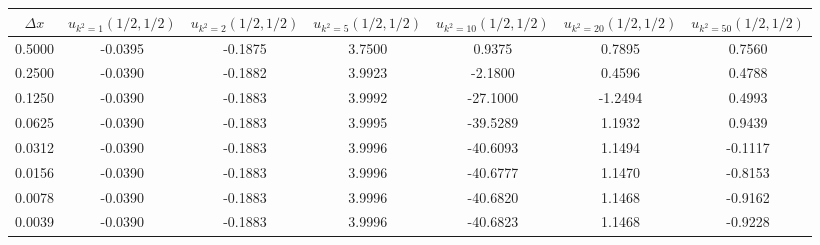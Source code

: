 \begin{tabular}{|c|c|c|c|c|c|c|}
\hline
\textbf{$\Delta x$}&\textbf{$u_{k^2=1}(1/2, 1/2)$}&\textbf{$u_{k^2=2}(1/2, 1/2)$}&\textbf{$u_{k^2=5}(1/2, 1/2)$}&\textbf{$u_{k^2=10}(1/2, 1/2)$}&\textbf{$u_{k^2=20}(1/2, 1/2)$}&\textbf{$u_{k^2=50}(1/2, 1/2)$}\\\hline
0.5000&-0.0395&-0.1875&3.7500&0.9375&0.7895&0.7560\\\hline
0.2500&-0.0390&-0.1882&3.9923&-2.1800&0.4596&0.4788\\\hline
0.1250&-0.0390&-0.1883&3.9992&-27.1000&-1.2494&0.4993\\\hline
0.0625&-0.0390&-0.1883&3.9995&-39.5289&1.1932&0.9439\\\hline
0.0312&-0.0390&-0.1883&3.9996&-40.6093&1.1494&-0.1117\\\hline
0.0156&-0.0390&-0.1883&3.9996&-40.6777&1.1470&-0.8153\\\hline
0.0078&-0.0390&-0.1883&3.9996&-40.6820&1.1468&-0.9162\\\hline
0.0039&-0.0390&-0.1883&3.9996&-40.6823&1.1468&-0.9228\\\hline
\end{tabular}
